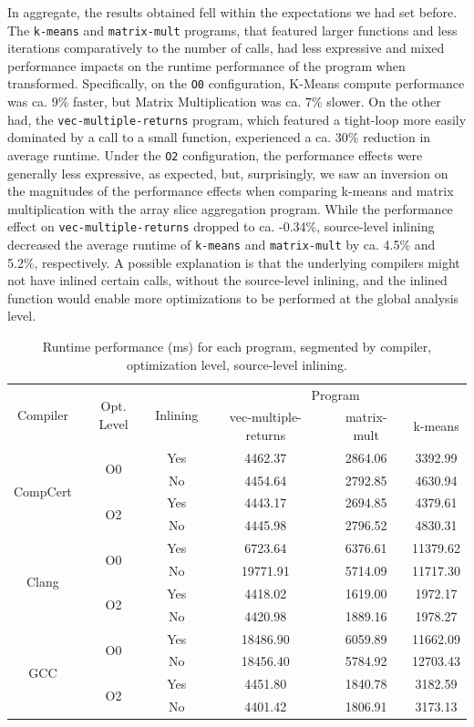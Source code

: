 In aggregate, the results obtained fell within the expectations we had set before. The \texttt{k-means} and \texttt{matrix-mult} programs, that featured larger functions and less iterations comparatively to the number of calls, had less expressive and mixed performance impacts on the runtime performance of the program when transformed. Specifically, on the \texttt{O0} configuration, K-Means compute performance was ca. 9\% faster, but Matrix Multiplication was ca. 7\% slower. On the other had, the \texttt{vec-multiple-returns} program, which featured a tight-loop more easily dominated by a call to a small function, experienced a ca. 30\% reduction in average runtime. Under the \texttt{O2} configuration, the performance effects were generally less expressive, as expected, but, surprisingly, we saw an inversion on the magnitudes of the performance effects when comparing k-means and matrix multiplication with the array slice aggregation program. While the performance effect on \texttt{vec-multiple-returns} dropped to ca. -0.34\%, source-level inlining decreased the average runtime of \texttt{k-means} and \texttt{matrix-mult} by ca. 4.5\% and 5.2\%, respectively. A possible explanation is that the underlying compilers might not have inlined certain calls, without the source-level inlining, and the inlined function would enable more optimizations to be performed at the global analysis level.

\begin{table}[]
\centering
\begin{tabular}{|c|c|c|ccc|}
\hline
\multirow{2}{*}{Compiler} & \multirow{2}{*}{Opt. Level} & \multirow{2}{*}{Inlining} & \multicolumn{3}{c|}{Program} \\
\cline{4-6} 
 & & & vec-multiple-returns & matrix-mult & k-means \\
\hline
\multirow{4}{*}{CompCert} & \multirow{2}{*}{O0} & Yes & 4462.37 & 2864.06 & 3392.99 \\
 & & No & 4454.64 & 2792.85 & 4630.94 \\
 & \multirow{2}{*}{O2} & Yes & 4443.17 & 2694.85 & 4379.61 \\
 & & No & 4445.98 & 2796.52 & 4830.31 \\
\hline
\multirow{4}{*}{Clang} & \multirow{2}{*}{O0} & Yes & 6723.64 & 6376.61 & 11379.62 \\
 & & No & 19771.91 & 5714.09 & 11717.30 \\
 & \multirow{2}{*}{O2} & Yes & 4418.02 & 1619.00 & 1972.17 \\
 & & No & 4420.98 & 1889.16 & 1978.27 \\
\hline
\multirow{4}{*}{GCC} & \multirow{2}{*}{O0} & Yes & 18486.90 & 6059.89 & 11662.09 \\
 & & No & 18456.40 & 5784.92 & 12703.43 \\
 & \multirow{2}{*}{O2} & Yes & 4451.80 & 1840.78 & 3182.59 \\
 & & No & 4401.42 & 1806.91 & 3173.13 \\
\hline
\end{tabular}
\caption{Runtime performance (ms) for each program, segmented by compiler, optimization level, source-level inlining.}
\label{tab:expb-pivot}
\end{table}

